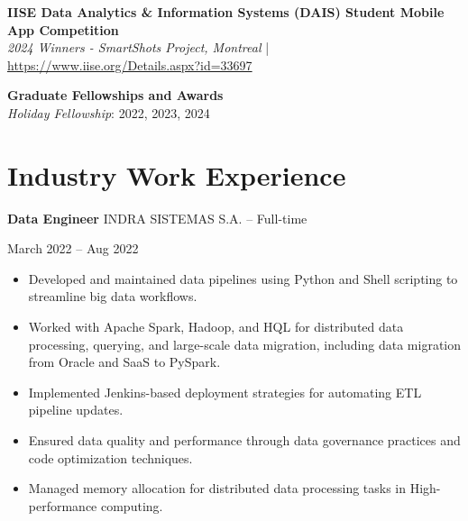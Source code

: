 \documentclass[10pt, letterpaper]{article}
\newenvironment{highlights}{
    \begin{itemize}[
        topsep=0.10 cm,
        parsep=0.10 cm,
        partopsep=0pt,
        itemsep=0pt,
        leftmargin=0 cm + 10pt
    ]
}{
    \end{itemize}
} %
\newenvironment{twocolentry}[2][]{
    \onecolentry
    \def\secondColumn{#2}
    \setcolumnwidth{\fill, 4.5 cm}
    \begin{paracol}{2}
}{
    \switchcolumn \raggedleft \secondColumn
    \end{paracol}
    \endonecolentry
} %
\begin{document}
     
    \noindent \textbf{IISE Data Analytics \& Information Systems (DAIS) Student Mobile App Competition} \\
    \textit{2024 Winners - SmartShots Project, Montreal} | \url{https://www.iise.org/Details.aspx?id=33697}\\
    
    
 
    \vspace{0.5em} %
    
    \noindent \textbf{Graduate Fellowships and Awards} \\
    \textit{Holiday Fellowship}: 2022, 2023, 2024 \\
    
    \vspace{0.5em} %
    




        
\section*{Industry Work Experience}
\small

\begin{twocolentry}{March 2022 – Aug 2022}
    \textbf{Data Engineer}  \textbar INDRA SISTEMAS S.A. – Full-time
\end{twocolentry}
\begin{highlights}
    \item Developed and maintained data pipelines using Python and Shell scripting to streamline big data workflows.
    \item Worked with Apache Spark, Hadoop, and HQL for distributed data processing, querying, and large-scale data migration, including data migration from Oracle and SaaS to PySpark.
    \item Implemented Jenkins-based deployment strategies for automating ETL pipeline updates.
    \item Ensured data quality and performance through data governance practices and code optimization techniques.
    \item Managed memory allocation for distributed data processing tasks in High-performance computing.
\end{highlights}
\vspace{0.3cm}
\end{document}
